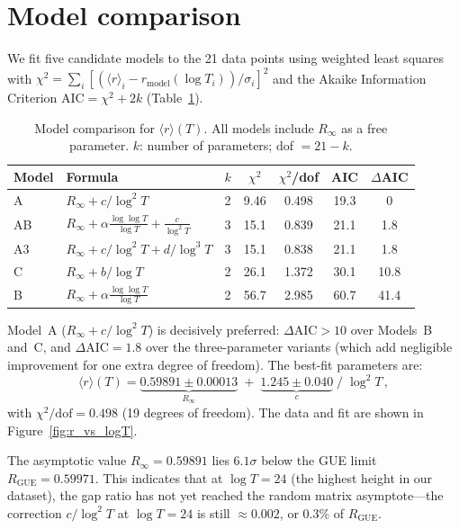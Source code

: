 \documentclass[11pt]{article}
\theoremstyle{plain}
\theoremstyle{remark}
\begin{document}
\section{Model comparison}
\label{sec:models}

We fit five candidate models to the 21 data points using weighted
least squares with
$\chi^2 = \sum_i [(\langle r\rangle_i - r_{\mathrm{model}}(\log T_i))/\sigma_i]^2$
and the Akaike Information Criterion $\mathrm{AIC} = \chi^2 + 2k$
(Table~\ref{tab:models}).

\begin{table}[ht]
\centering
\caption{Model comparison for $\langle r\rangle(T)$. All models include
$R_\infty$ as a free parameter. $k$: number of parameters; dof $= 21 - k$.}
\label{tab:models}
\begin{tabular}{llccccc}
\toprule
Model & Formula & $k$ & $\chi^2$ & $\chi^2$/dof & AIC & $\Delta$AIC \\
\midrule
A  & $R_\infty + c/\log^2 T$ & 2 & 9.46 & 0.498 & 19.3 & 0 \\
AB & $R_\infty + \alpha\frac{\log\log T}{\log T} + \frac{c}{\log^2 T}$ & 3 & 15.1 & 0.839 & 21.1 & 1.8 \\
A3 & $R_\infty + c/\log^2 T + d/\log^3 T$ & 3 & 15.1 & 0.838 & 21.1 & 1.8 \\
C  & $R_\infty + b/\log T$ & 2 & 26.1 & 1.372 & 30.1 & 10.8 \\
B  & $R_\infty + \alpha\frac{\log\log T}{\log T}$ & 2 & 56.7 & 2.985 & 60.7 & 41.4 \\
\bottomrule
\end{tabular}
\end{table}

Model~A ($R_\infty + c/\log^2 T$) is decisively preferred:
$\Delta\mathrm{AIC} > 10$ over Models~B and~C, and $\Delta\mathrm{AIC} = 1.8$
over the three-parameter variants (which add negligible improvement for one
extra degree of freedom). The best-fit parameters are:
\begin{equation}
\boxed{
\langle r\rangle(T) = \underbrace{0.59891 \pm 0.00013}_{R_\infty}
\;+\; \underbrace{1.245 \pm 0.040}_{c}\;\big/\;\log^2 T\,,
}
\label{eq:modelA}
\end{equation}
with $\chi^2/\text{dof} = 0.498$ (19 degrees of freedom). The data and
fit are shown in Figure~\ref{fig:r_vs_logT}.

The asymptotic value $R_\infty = 0.59891$ lies $6.1\sigma$ below the GUE
limit $R_{\mathrm{GUE}} = 0.59971$. This indicates that at $\log T = 24$
(the highest height in our dataset), the gap ratio has not yet reached
the random matrix asymptote---the correction $c/\log^2 T$ at $\log T = 24$
is still $\approx 0.002$, or $0.3\%$ of $R_{\mathrm{GUE}}$.
\end{document}
